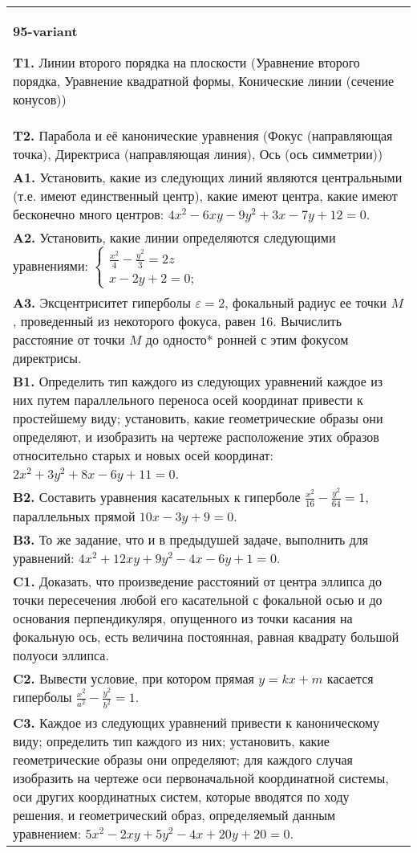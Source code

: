 \documentclass{article}
\begin{document}
\begin{tabular}{m{17cm}}
\textbf{95-variant}
\newline

\textbf{T1.} Линии второго порядка на плоскости (Уравнение второго порядка, Уравнение квадратной формы, Конические линии (сечение конусов)) \\
\textbf{T2.} Парабола и её канонические уравнения (Фокус (направляющая точка), Директриса (направляющая линия), Ось (ось симметрии)) \\
\textbf{A1.} Установить, какие из следующих линий являются центральными (т.е. имеют единственный центр), какие имеют центра, какие имеют бесконечно много центров: $4 x^2-6 x y-9 y^2+3 x-7 y+12=0$. \\
\textbf{A2.} Установить, какие линии определяются следующими уравнениями: $\left\{\begin{array}{l}\frac{x^2}{4}-\frac{y^2}{3}=2 z \\ x-2 y+2=0 ;\end{array}\right.$ \\
\textbf{A3.} Эксцентриситет гиперболы $\varepsilon=2$, фокальный радиус ее точки $M$, проведенный из некоторого фокуса, равен 16. Вычислить расстояние от точки $M$ до односто* ронней с этим фокусом директрисы. \\
\textbf{B1.} Определить тип каждого из следующих уравнений каждое из них путем параллельного переноса осей координат привести к простейшему виду; установить, какие геометрические образы они определяют, и изобразить на чертеже расположение этих образов относительно старых и новых осей координат: $2 x^2+3 y^2+8 x-6 y+11=0$. \\
\textbf{B2.} Составить уравнения касательных к гиперболе $\frac{x^2}{16}-\frac{y^2}{64}=1$, параллельных прямой $10 x-3 y+9=0$. \\
\textbf{B3.} То же задание, что и в предыдушей задаче, выполнить для уравнений: $4 x^2+12 x y+9 y^2-4 x-6 y+1=0$. \\
\textbf{C1.} Доказать, что произведение расстояний от центра эллипса до точки пересечения любой его касательной с фокальной осью и до основания перпендикуляря, опущенного из точки касания на фокальную ось, есть величина постоянная, равная квадрату большой полуоси эллипса. \\
\textbf{C2.} Вывести условие, при котором прямая $y=k x+m$ касается гиперболы $\frac{x^2}{a^2}-\frac{y^2}{b^2}=1$. \\
\textbf{C3.} Каждое из следующих уравнений привести к каноническому виду; определить тип каждого из них; установить, какие геометрические образы они определяют; для каждого случая изобразить на чертеже оси первоначальной координатной системы, оси других координатных систем, которые вводятся по ходу решения, и геометрический образ, определяемый данным уравнением: $5 x^2-2 x y+5 y^2-4 x+20 y+20=0$. \\

\end{tabular}
\vspace{1cm}
\end{document}
